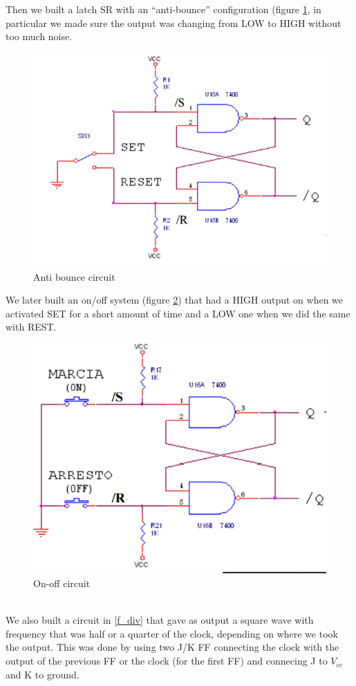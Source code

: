 Then we  built a latch SR with an ``anti-bounce'' configuration (figure \ref{bounce}, in particular we made sure the output was changing from LOW to HIGH without too much noise.
\begin{figure}[H]
\centering
\includegraphics[width=.7\textwidth]{11/bounce.png}
\caption{Anti bounce circuit}\label{bounce}

\end{figure}
We later built an on/off system (figure \ref{ON_OFF}) that had a HIGH output on when we activated SET for a short amount of time and a LOW one when we did the same with REST.
\begin{figure}[H]
\centering
\includegraphics[width=.7\textwidth]{11/ON_OFF.png}
\caption{On-off circuit}\label{ON_OFF}

\end{figure}\\
We also built a circuit in \ref{f_div} that gave as output a square wave with frequency that was half or a quarter of  the clock, depending on where we took the output. This was done by using two J/K FF connecting the clock with the output of the previous  FF or the clock (for the first FF) and connecing J to $V_{cc}$ and K to ground.
